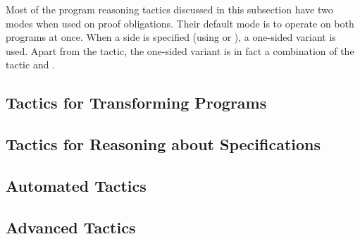 Most of the program reasoning tactics discussed in this subsection
have two modes when used on \prhl proof obligations. Their default
mode is to operate on both programs at once. When a side is specified
(using  or ), a one-sided variant
is used. Apart from the  tactic, the one-sided variant is
in fact a combination of the \phl tactic and .

\medskip











\subsection{Tactics for Transforming Programs}
\label{TransformingPrograms}

















\subsection{Tactics for Reasoning about Specifications}














\subsection{Automated Tactics}
\label{AutomatedTactics}




\subsection{Advanced Tactics}
\label{AdvancedTactics}



